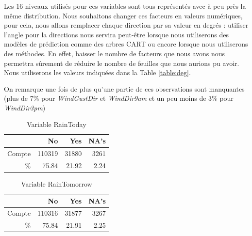 \documentclass{article}
\begin{document}
Les 16 niveaux utilisés pour ces variables sont tous représentés avec à peu près la même distribution. Nous souhaitons changer ces facteurs en valeurs numériques, pour cela, nous allons remplacer chaque direction par sa valeur en degrés : utiliser l'angle pour la directions nous servira peut-être lorsque nous utiliserons des modèles de prédiction comme des arbres CART ou encore lorsque nous utiliserons des méthodes. En effet, baisser le nombre de facteurs que nous avons nous permettra sûrement de réduire le nombre de feuilles que nous aurions pu avoir. Nous utiliserons les valeurs indiquées dans la Table \ref{table:deg}.

\begin{table}[htp]
    \centering
    \caption{Les 16 points cardinaux en degrés}
    \label{table:deg}
\end{table}

On remarque une fois de plus qu'une partie de ces observations sont manquantes (plus de 7\% pour \emph{WindGustDir} et \emph{WindDir9am} et un peu moins de 3\% pour \emph{WindDir3pm})

\begin{table}[htp]
    \centering
    \begin{tabular}{|r||rrr|}
        \hline
        &    No &    Yes &   NA's \\
        \hline
        \hline
        Compte & 110319 &  31880 &   3261 \\
        \% & 75.84 & 21.92 & 2.24 \\
        \hline
    \end{tabular}
    \caption{Variable RainToday}
    \label{table:rain_today}
\end{table}

\begin{table}[htp]
    \centering
    \begin{tabular}{|r||rrr|}
        \hline
        &    No &    Yes &   NA's \\
        \hline
        \hline
        Compte & 110316 &  31877 &   3267 \\
        \% & 75.84 & 21.91 & 2.25 \\
        \hline
    \end{tabular}
    \caption{Variable RainTomorrow}
    \label{table:rain_tomorrow}
\end{table}
\end{document}
